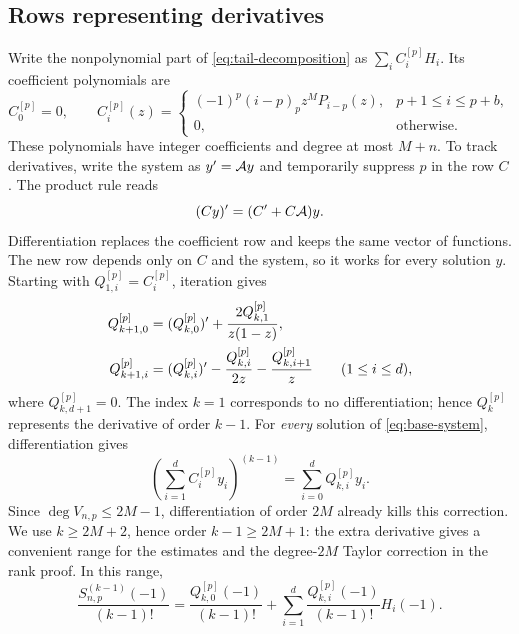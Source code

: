 \subsection{Rows representing derivatives}

Write the nonpolynomial part of \eqref{eq:tail-decomposition} as
$\sum_i C_i^{[p]}H_i$. Its coefficient polynomials are
\begin{equation}\label{eq:C}
 C_0^{[p]}=0,\qquad
 C_i^{[p]}(z)=
 \begin{cases}
 (-1)^p(i-p)_p z^M P_{i-p}(z),&p+1\leq i\leq p+b,\\
 0,&\text{otherwise}.
 \end{cases}
\end{equation}
These polynomials have integer coefficients and degree at most $M+n$.
To track derivatives, write the system as $y'=\mathcal A y$ and temporarily
suppress $p$ in the row $C$. The product rule reads
\[
 (Cy)'=(C'+C\mathcal A)y.
\]
Differentiation replaces the coefficient row and keeps the same vector
of functions. The new row depends only on $C$ and the system, so it
works for every solution $y$.
Starting with $Q_{1,i}^{[p]}=C_i^{[p]}$, iteration gives
\begin{align}
 Q_{k+1,0}^{[p]}&=(Q_{k,0}^{[p]})'
                   +\frac{2Q_{k,1}^{[p]}}{z(1-z)},\notag\\
 Q_{k+1,i}^{[p]}&=(Q_{k,i}^{[p]})'
                   -\frac{Q_{k,i}^{[p]}}{2z}
                   -\frac{Q_{k,i+1}^{[p]}}z
                    \qquad(1\leq i\leq d),                    \label{eq:Q}
\end{align}
where $Q_{k,d+1}^{[p]}=0$. The index $k=1$ corresponds to no
differentiation; hence $Q_k^{[p]}$ represents the derivative of order
$k-1$.
For \emph{every} solution of \eqref{eq:base-system}, differentiation gives
\begin{equation}\label{eq:universal-row}
 \left(\sum_{i=1}^d C_i^{[p]}y_i\right)^{(k-1)}
       =\sum_{i=0}^d Q_{k,i}^{[p]}y_i.
\end{equation}
Since $\deg V_{n,p}\leq2M-1$, differentiation of order $2M$ already
kills this correction. We use $k\geq2M+2$, hence order $k-1\geq2M+1$:
the extra derivative gives a convenient range for the estimates and
the degree-$2M$ Taylor correction in the rank proof. In this range,
\begin{equation}\label{eq:value-row}
 \frac{S_{n,p}^{(k-1)}(-1)}{(k-1)!}
  =\frac{Q_{k,0}^{[p]}(-1)}{(k-1)!}
     +\sum_{i=1}^d\frac{Q_{k,i}^{[p]}(-1)}{(k-1)!}H_i(-1).
\end{equation}
